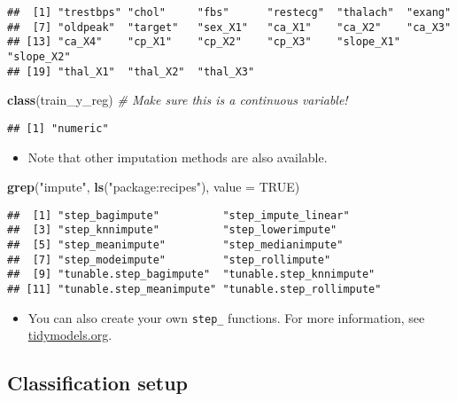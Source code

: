 \documentclass[
]{book}
\newenvironment{Shaded}{\begin{snugshade}}{\end{snugshade}}
\newcommand{\CommentTok}[1]{\textcolor[rgb]{0.56,0.35,0.01}{\textit{#1}}}
\newcommand{\DataTypeTok}[1]{\textcolor[rgb]{0.13,0.29,0.53}{#1}}
\newcommand{\KeywordTok}[1]{\textcolor[rgb]{0.13,0.29,0.53}{\textbf{#1}}}
\newcommand{\NormalTok}[1]{#1}
\newcommand{\OtherTok}[1]{\textcolor[rgb]{0.56,0.35,0.01}{#1}}
\newcommand{\StringTok}[1]{\textcolor[rgb]{0.31,0.60,0.02}{#1}}
\providecommand{\tightlist}{%
  \setlength{\itemsep}{0pt}\setlength{\parskip}{0pt}}
\begin{document}
\begin{verbatim}
##  [1] "trestbps" "chol"     "fbs"      "restecg"  "thalach"  "exang"   
##  [7] "oldpeak"  "target"   "sex_X1"   "ca_X1"    "ca_X2"    "ca_X3"   
## [13] "ca_X4"    "cp_X1"    "cp_X2"    "cp_X3"    "slope_X1" "slope_X2"
## [19] "thal_X1"  "thal_X2"  "thal_X3"
\end{verbatim}

\begin{Shaded}
\begin{Highlighting}[]
\KeywordTok{class}\NormalTok{(train\_y\_reg) }\CommentTok{\# Make sure this is a continuous variable!}
\end{Highlighting}
\end{Shaded}

\begin{verbatim}
## [1] "numeric"
\end{verbatim}

\begin{itemize}
\tightlist
\item
  Note that other imputation methods are also available.
\end{itemize}

\begin{Shaded}
\begin{Highlighting}[]
\KeywordTok{grep}\NormalTok{(}\StringTok{"impute"}\NormalTok{, }\KeywordTok{ls}\NormalTok{(}\StringTok{"package:recipes"}\NormalTok{), }\DataTypeTok{value =} \OtherTok{TRUE}\NormalTok{)}
\end{Highlighting}
\end{Shaded}

\begin{verbatim}
##  [1] "step_bagimpute"          "step_impute_linear"     
##  [3] "step_knnimpute"          "step_lowerimpute"       
##  [5] "step_meanimpute"         "step_medianimpute"      
##  [7] "step_modeimpute"         "step_rollimpute"        
##  [9] "tunable.step_bagimpute"  "tunable.step_knnimpute" 
## [11] "tunable.step_meanimpute" "tunable.step_rollimpute"
\end{verbatim}

\begin{itemize}
\tightlist
\item
  You can also create your own \texttt{step\_} functions. For more information, see \href{https://www.tidymodels.org/learn/develop/recipes/}{tidymodels.org}.
\end{itemize}

\hypertarget{classification-setup}{%
\subsection{Classification setup}\label{classification-setup}}
\end{document}
